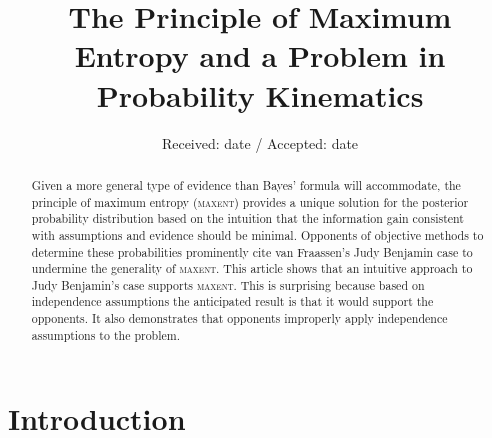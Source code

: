 \documentclass[smallextended]{svjour3}       %
\begin{document}
\title{The Principle of Maximum Entropy and a Problem in Probability Kinematics}

\author{}


\date{Received: date / Accepted: date}

\maketitle

\begin{abstract}
  \noindent Given a more general type of evidence than Bayes' formula
  will accommodate, the principle of maximum entropy (\textsc{maxent})
  provides a unique solution for the posterior probability
  distribution based on the intuition that the information gain
  consistent with assumptions and evidence should be minimal.
  Opponents of objective methods to determine these probabilities
  prominently cite van Fraassen's Judy Benjamin case to undermine the
  generality of \textsc{maxent}. This article shows that an intuitive
  approach to Judy Benjamin's case supports \textsc{maxent}. This is
  surprising because based on independence assumptions the anticipated
  result is that it would support the opponents. It also demonstrates
  that opponents improperly apply independence assumptions to the
  problem.
\end{abstract}

\section{Introduction}
\label{Introduction}
\end{document}
